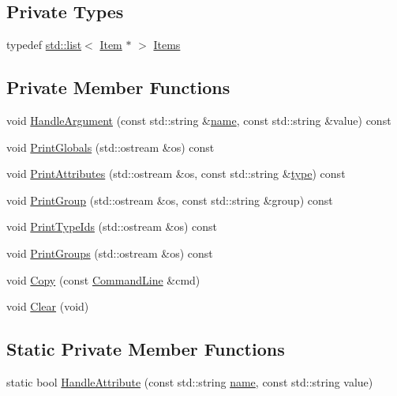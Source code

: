 \subsection*{Private Types}
\begin{DoxyCompactItemize}
\item 
typedef \hyperlink{openflow-interface_8h_afd9bcfa176617760671b67580f536fa7}{std\+::list}$<$ \hyperlink{classns3_1_1CommandLine_1_1Item}{Item} $\ast$ $>$ \hyperlink{classns3_1_1CommandLine_a1150dc31fbfd2fb9d622be08ff15f6ad}{Items}
\end{DoxyCompactItemize}
\subsection*{Private Member Functions}
\begin{DoxyCompactItemize}
\item 
void \hyperlink{classns3_1_1CommandLine_a527b83304a3c713f3e84711a8a2185a7}{Handle\+Argument} (const std\+::string \&\hyperlink{generate__test__data__lte__spectrum__model_8m_ab74e6bf80237ddc4109968cedc58c151}{name}, const std\+::string \&value) const 
\item 
void \hyperlink{classns3_1_1CommandLine_ae531d3f88153ab9edac51509cc0cf8be}{Print\+Globals} (std\+::ostream \&os) const 
\item 
void \hyperlink{classns3_1_1CommandLine_a1257dece593fadf03777c71ea4f49b89}{Print\+Attributes} (std\+::ostream \&os, const std\+::string \&\hyperlink{visualizer-ideas_8txt_add98db9e15e2a58cf2b57623e7aa893a}{type}) const 
\item 
void \hyperlink{classns3_1_1CommandLine_abb65c554c9c8f54e815ce54cf8abcd0e}{Print\+Group} (std\+::ostream \&os, const std\+::string \&group) const 
\item 
void \hyperlink{classns3_1_1CommandLine_a141b4fcef1091a980f15f0845166e20b}{Print\+Type\+Ids} (std\+::ostream \&os) const 
\item 
void \hyperlink{classns3_1_1CommandLine_acbfbd40c40508f3b0700d41de1f53089}{Print\+Groups} (std\+::ostream \&os) const 
\item 
void \hyperlink{classns3_1_1CommandLine_a5e48d5082875d4ac80ff52e61c956504}{Copy} (const \hyperlink{classns3_1_1CommandLine}{Command\+Line} \&cmd)
\item 
void \hyperlink{classns3_1_1CommandLine_a7639243a66f5551a21f6a5af263dc3f6}{Clear} (void)
\end{DoxyCompactItemize}
\subsection*{Static Private Member Functions}
\begin{DoxyCompactItemize}
\item 
static bool \hyperlink{classns3_1_1CommandLine_af1fea2680a68a10ce801b1700d0b8693}{Handle\+Attribute} (const std\+::string \hyperlink{generate__test__data__lte__spectrum__model_8m_ab74e6bf80237ddc4109968cedc58c151}{name}, const std\+::string value)
\end{DoxyCompactItemize}
